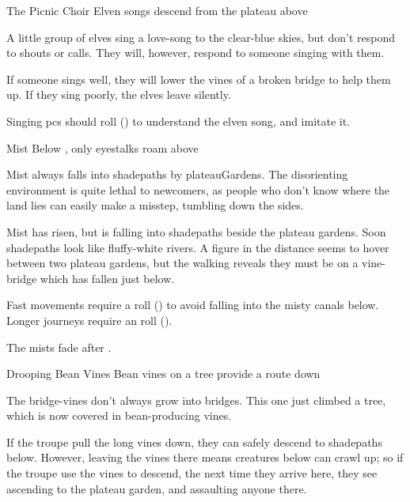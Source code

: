 
{The Picnic Choir}%
{Elven songs descend from the plateau above}%

A little group of elves sing a love-song to the clear-blue skies, but don't respond to shouts or calls.
They will, however, respond to someone singing with them.

If someone sings well, they will lower the vines of a broken bridge to help them up.
If they sing poorly, the elves leave silently.

Singing \glspl{pc} should roll  (\tn[10]) to understand the elven song, and imitate it.

{Mist Below}%
{, only eyestalks roam above}%

Mist always falls into \gls{shadepaths} by \gls{plateauGardens}.
The disorienting environment is quite lethal to newcomers, as people who don't know where the land lies can easily make a misstep, tumbling down the sides.

\begin{boxtext}
  Mist has risen, but is falling into \gls{shadepaths} beside the plateau gardens.
  Soon \gls{shadepaths} look like fluffy-white rivers.
  A figure in the distance seems to hover between two plateau gardens, but the walking reveals they must be on a vine-bridge which has fallen just below.
\end{boxtext}

Fast movements require a  roll (\tn[8]) to avoid falling into the misty canals below.
Longer journeys require an  roll (\tn[10]).

The mists fade after .

{Drooping Bean Vines}%
{Bean vines on a tree provide a route down}%

The bridge-vines don't always grow into bridges.
This one just climbed a tree, which is now covered in bean-producing vines.

If the troupe pull the long vines down, they can safely descend to \gls{shadepaths} below.
However, leaving the vines there means creatures below can crawl up; so if the troupe use the vines to descend, the next time they arrive here, they see  ascending to the plateau garden, and assaulting anyone there.

